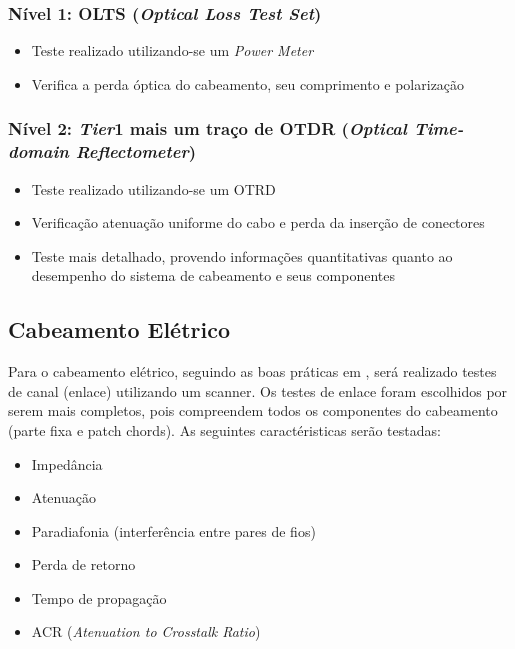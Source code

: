 \documentclass[	DIV=calc,%
							paper=a4,%
							fontsize=12pt,%
							onecolumn]{scrartcl}	 					%
\begin{document}
\subsubsection{Nível 1: OLTS (\textit{Optical Loss Test Set})}
\begin{itemize}
	\item Teste realizado utilizando-se um \textit{Power Meter}
	\item Verifica a perda óptica do cabeamento, seu comprimento e polarização
\end{itemize}

\subsubsection{Nível 2: \textit{Tier}1 mais um traço de OTDR (\textit{Optical Time-domain Reflectometer})}
\begin{itemize}
	\item Teste realizado utilizando-se um OTRD
	\item Verificação atenuação uniforme do cabo e perda da inserção de conectores
	\item Teste mais detalhado, provendo informações quantitativas quanto ao desempenho do sistema de cabeamento e seus componentes
\end{itemize}

\subsection{Cabeamento Elétrico}
Para o cabeamento elétrico, seguindo as boas práticas em \cite{ref6}, será realizado testes de canal (enlace) utilizando um scanner.
Os testes de enlace foram escolhidos por serem mais completos, pois compreendem todos os componentes do cabeamento (parte fixa e patch chords).
As seguintes caractéristicas serão testadas:
\begin{itemize}
	\item Impedância
	\item Atenuação
	\item Paradiafonia (interferência entre pares de fios)
	\item Perda de retorno
	\item Tempo de propagação
	\item ACR (\textit{Atenuation to Crosstalk Ratio})
\end{itemize}
\end{document}
